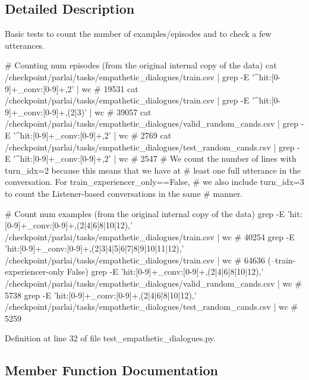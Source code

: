 \subsection{Detailed Description}
\begin{DoxyVerb}Basic tests to count the number of examples/episodes and to check a few utterances.

# Counting num episodes (from the original internal copy of the data)
cat /checkpoint/parlai/tasks/empathetic_dialogues/train.csv | grep -E '^hit:[0-9]+_conv:[0-9]+,2' | wc  # 19531
cat /checkpoint/parlai/tasks/empathetic_dialogues/train.csv | grep -E '^hit:[0-9]+_conv:[0-9]+,(2|3)' | wc  # 39057
cat /checkpoint/parlai/tasks/empathetic_dialogues/valid_random_cands.csv | grep -E '^hit:[0-9]+_conv:[0-9]+,2' | wc  # 2769
cat /checkpoint/parlai/tasks/empathetic_dialogues/test_random_cands.csv | grep -E '^hit:[0-9]+_conv:[0-9]+,2' | wc  # 2547
# We count the number of lines with turn_idx=2 because this means that we have at
# least one full utterance in the conversation. For train_experiencer_only==False,
# we also include turn_idx=3 to count the Listener-based conversations in the same
# manner.

# Count num examples (from the original internal copy of the data)
grep -E 'hit:[0-9]+_conv:[0-9]+,(2|4|6|8|10|12),' /checkpoint/parlai/tasks/empathetic_dialogues/train.csv | wc  # 40254
grep -E 'hit:[0-9]+_conv:[0-9]+,(2|3|4|5|6|7|8|9|10|11|12),' /checkpoint/parlai/tasks/empathetic_dialogues/train.csv | wc  # 64636 (--train-experiencer-only False)
grep -E 'hit:[0-9]+_conv:[0-9]+,(2|4|6|8|10|12),' /checkpoint/parlai/tasks/empathetic_dialogues/valid_random_cands.csv | wc  # 5738
grep -E 'hit:[0-9]+_conv:[0-9]+,(2|4|6|8|10|12),' /checkpoint/parlai/tasks/empathetic_dialogues/test_random_cands.csv | wc  # 5259
\end{DoxyVerb}
 

Definition at line 32 of file test\+\_\+empathetic\+\_\+dialogues.\+py.



\subsection{Member Function Documentation}
\mbox{\label{classtest__empathetic__dialogues_1_1TestEDTeacher_a51cf9a7b2adb6521bcedde034d8b8efb}} 
